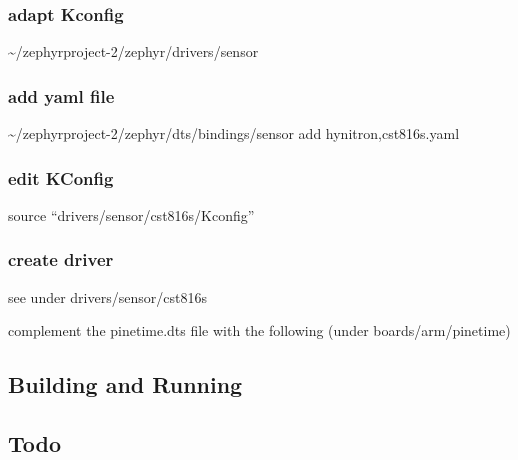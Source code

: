 \documentclass[letterpaper,10pt,english]{sphinxmanual}
\begin{document}
\subsubsection{adapt Kconfig}
\label{\detokenize{drivers/cst816s:adapt-kconfig}}
\textasciitilde{}/zephyrproject-2/zephyr/drivers/sensor


\subsubsection{add yaml file}
\label{\detokenize{drivers/cst816s:add-yaml-file}}
\textasciitilde{}/zephyrproject-2/zephyr/dts/bindings/sensor
add  hynitron,cst816s.yaml


\subsubsection{edit KConfig}
\label{\detokenize{drivers/cst816s:edit-kconfig}}
source “drivers/sensor/cst816s/Kconfig”


\subsubsection{create driver}
\label{\detokenize{drivers/cst816s:create-driver}}
see under drivers/sensor/cst816s

complement the pinetime.dts file with the following (under boards/arm/pinetime)

\begin{sphinxVerbatim}[commandchars=\\\{\}]
\end{sphinxVerbatim}


\subsection{Building and Running}
\label{\detokenize{drivers/cst816s:building-and-running}}

\subsection{Todo}
\label{\detokenize{drivers/cst816s:todo}}
\end{document}
